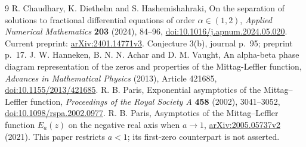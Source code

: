 \documentclass[11pt]{article}
\begin{document}
\small
\begin{thebibliography}{9}
 R. Chaudhary, K. Diethelm and S. Hashemishahraki,
On the separation of solutions to fractional differential equations
of order $\alpha\in(1,2)$, \emph{Applied Numerical Mathematics}
\textbf{203} (2024), 84--96,
\href{https://doi.org/10.1016/j.apnum.2024.05.020}{doi:10.1016/j.apnum.2024.05.020}.
Current preprint: \href{https://arxiv.org/abs/2401.14771}{arXiv:2401.14771v3}.
Conjecture 3(b), journal p.~95; preprint p.~17.
 J. W. Hanneken, B. N. N. Achar and D. M. Vaught,
An alpha-beta phase diagram representation of the zeros and properties
of the Mittag-Leffler function, \emph{Advances in Mathematical Physics}
(2013), Article 421685,
\href{https://doi.org/10.1155/2013/421685}{doi:10.1155/2013/421685}.
 R. B. Paris, Exponential asymptotics of the
Mittag--Leffler function, \emph{Proceedings of the Royal Society A}
\textbf{458} (2002), 3041--3052,
\href{https://doi.org/10.1098/rspa.2002.0977}{doi:10.1098/rspa.2002.0977}.
 R. B. Paris, Asymptotics of the Mittag--Leffler
function $E_a(z)$ on the negative real axis when $a\to1$,
\href{https://arxiv.org/abs/2005.05737}{arXiv:2005.05737v2} (2021).
This paper restricts $a<1$; its first-zero counterpart is not asserted.
\end{thebibliography}
\end{document}
